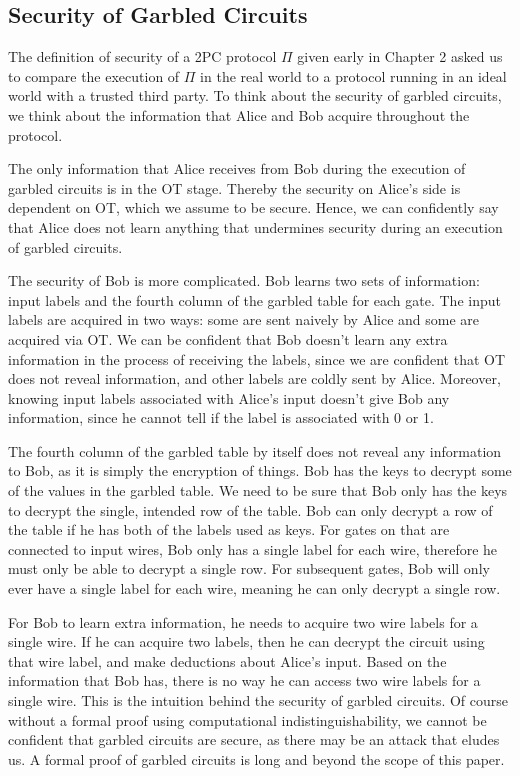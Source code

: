\subsection{Security of Garbled Circuits}
The definition of security of a 2PC protocol $\Pi$ given early in Chapter 2 asked us to compare the execution of $\Pi$ in the real world to a protocol running in an ideal world with a trusted third party.
To think about the security of garbled circuits, we think about the information that Alice and Bob acquire throughout the protocol.

The only information that Alice receives from Bob during the execution of garbled circuits is in the OT stage.
Thereby the security on Alice's side is dependent on OT, which we assume to be secure.
Hence, we can confidently say that Alice does not learn anything that undermines security during an execution of garbled circuits.

The security of Bob is more complicated.
Bob learns two sets of information: input labels  and the fourth column of the garbled table for each gate.
The input labels are acquired in two ways: some are sent naively by Alice and some are acquired via OT.
We can be confident that Bob doesn't learn any extra information in the process of receiving the labels, since we are confident that OT does not reveal information, and other labels are coldly sent by Alice.
Moreover, knowing input labels associated with Alice's input doesn't give Bob any information, since he cannot tell if the label is associated with 0 or 1.

The fourth column of the garbled table by itself does not reveal any information to Bob, as it is simply the encryption of things.
Bob has the keys to decrypt some of the values in the garbled table.
We need to be sure that Bob only has the keys to decrypt the single, intended row of the table.
Bob can only decrypt a row of the table if he has both of the labels used as keys.
For gates on that are connected to input wires, Bob only has a single label for each wire, therefore he must only be able to decrypt a single row.
For subsequent gates, Bob will only ever have a single label for each wire, meaning he can only decrypt a single row.

For Bob to learn extra information, he needs to acquire two wire labels for a single wire.
If he can acquire two labels, then he can decrypt the circuit using that wire label, and make deductions about Alice's input. 
Based on the information that Bob has, there is no way he can access two wire labels for a single wire.
This is the intuition behind the security of garbled circuits.
Of course without a formal proof using computational indistinguishability, we cannot be confident that garbled circuits are secure, as there may be an attack that eludes us.
A formal proof of garbled circuits is long and beyond the scope of this paper. 

